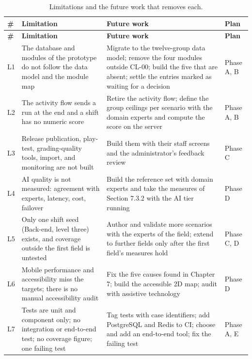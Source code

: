 {\small{}\renewcommand{\arraystretch}{1.1}
\begin{longtable}{|>{\raggedright\arraybackslash}p{}|>{\raggedright\arraybackslash}p{}|>{\raggedright\arraybackslash}p{}|>{\raggedright\arraybackslash}p{}|}
\caption{Limitations and the future work that removes each.} \\
\hline
\textbf{\#} & \textbf{Limitation} & \textbf{Future work} & \textbf{Plan} \\ \hline
\endfirsthead
\hline
\textbf{\#} & \textbf{Limitation} & \textbf{Future work} & \textbf{Plan} \\ \hline
\endhead
L1 & The database and modules of the prototype do not follow the data model and the module map & Migrate to the twelve-\allowbreak{}group data model; remove the four modules outside CL-00; build the five that are absent; settle the entries marked as waiting for a decision & Phase A, B \\ \hline
L2 & The activity flow sends a run at the end and a shift has no numeric score & Retire the activity flow; define the group ceilings per scenario with the domain experts and compute the score on the server & Phase A, B \\ \hline
L3 & Release publication, play-test, grading-\allowbreak{}quality tools, import, and monitoring are not built & Build them with their staff screens and the administrator's feedback review & Phase C \\ \hline
L4 & AI quality is not measured: agreement with experts, latency, cost, failover & Build the reference set with domain experts and take the measures of Section 7.3.2 with the AI tier running & Phase D \\ \hline
L5 & Only one shift seed (Back-end, level three) exists, and coverage outside the first field is untested & Author and validate more scenarios with the experts of the field; extend to further fields only after the first field's measures hold & Phase C, D \\ \hline
L6 & Mobile performance and accessibility miss the targets; there is no manual accessibility audit & Fix the five causes found in Chapter 7; build the accessible 2D map; audit with assistive technology & Phase D \\ \hline
L7 & Tests are unit and component only; no integration or end-to-end test; no coverage figure; one failing test & Tag tests with case identifiers; add PostgreSQL and Redis to CI; choose and add an end-to-end tool; fix the failing test & Phase A, E \\ \hline

\end{longtable}}
